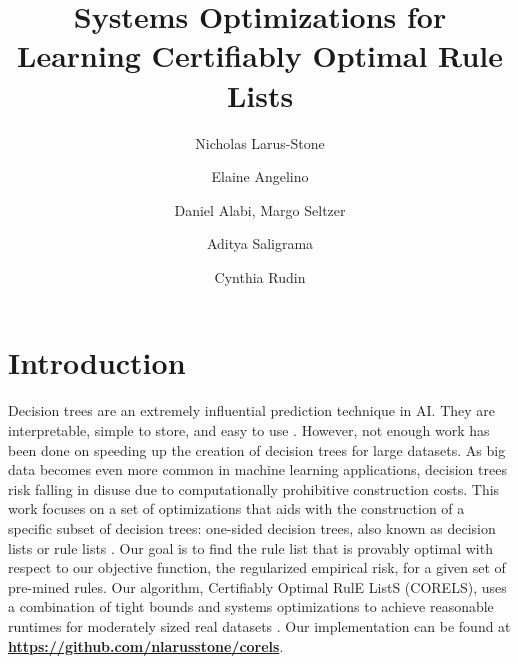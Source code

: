 \documentclass[format=sigconf]{acmart}
\begin{document}
\title{Systems Optimizations for \\ Learning Certifiably Optimal Rule Lists}
\author{Nicholas Larus-Stone}

\author{Elaine Angelino}

\author{Daniel Alabi, Margo Seltzer}

\author{Aditya Saligrama}

\author{Cynthia Rudin}

\setlength{\abovedisplayskip}{3pt}
\setlength{\belowdisplayskip}{-10pt}
\setlength{\textfloatsep}{8pt}

\maketitle

\section{Introduction}
Decision trees are an extremely influential prediction technique in AI.
They are interpretable, simple to store, and easy to use \cite{BreimanFrOlSt84}.
However, not enough work has been done on speeding up the creation of decision trees for large datasets.
As big data becomes even more common in machine learning applications, decision trees risk falling in disuse due to computationally prohibitive construction costs.
This work focuses on a set of optimizations that aids with the construction of a specific subset of decision trees: one-sided decision trees, also known as decision lists or rule lists \cite{Rivest87}.
Our goal is to find the rule list that is provably optimal with respect to our objective function, the regularized empirical risk, for a given set of pre-mined rules.
Our algorithm, Certifiably Optimal RulE ListS (CORELS), uses a combination of tight bounds and systems optimizations to achieve reasonable runtimes for moderately sized real datasets \citep{AngelinoLaAlSeRu17-kdd, AngelinoLaAlSeRu17}. Our implementation can be found at \textbf{\url{https://github.com/nlarusstone/corels}}.
\end{document}
